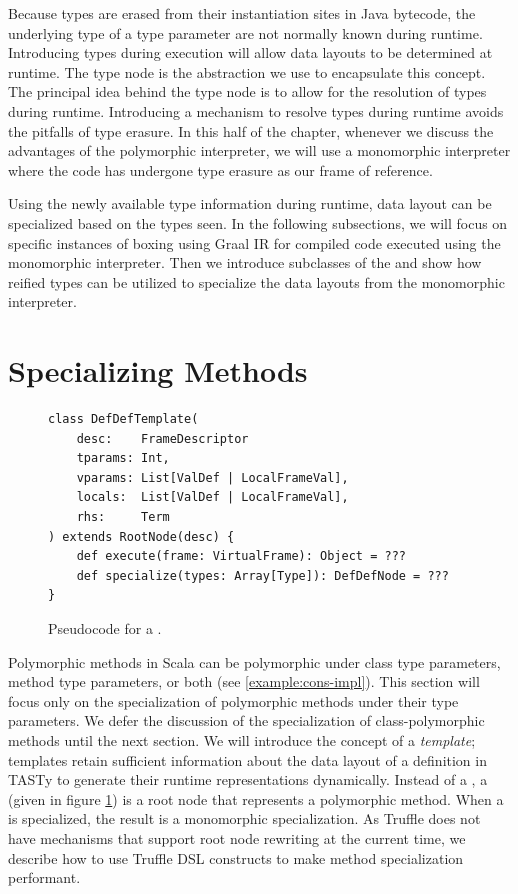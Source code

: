 Because types are erased from their instantiation sites in Java bytecode, the underlying type of a type parameter are not normally known during runtime. 
Introducing types during execution will allow data layouts to be determined at runtime.
The type node is the abstraction we use to encapsulate this concept.
The principal idea behind the type node is to allow for the resolution of types during runtime.
Introducing a mechanism to resolve types during runtime avoids the pitfalls of type erasure.
In this half of the chapter, whenever we discuss the advantages of the polymorphic interpreter, we will use a monomorphic interpreter where the code has undergone type erasure as our frame of reference.

Using the newly available type information during runtime, data layout can be specialized based on the types seen.
In the following subsections, we will focus on specific instances of boxing using Graal IR for compiled code executed using the monomorphic interpreter.
Then we introduce subclasses of the  and show how reified types can be utilized to specialize the data layouts from the monomorphic interpreter.

\section{Specializing Methods}

\begin{figure}[!htb]
\begin{verbatim}
class DefDefTemplate(
	desc:    FrameDescriptor
	tparams: Int, 
	vparams: List[ValDef | LocalFrameVal], 
	locals:  List[ValDef | LocalFrameVal],
	rhs:     Term
) extends RootNode(desc) {
	def execute(frame: VirtualFrame): Object = ???
	def specialize(types: Array[Type]): DefDefNode = ???
}
\end{verbatim}
\caption{Pseudocode for a .}
\label{impl:defdeftemplate}
\end{figure}

Polymorphic methods in Scala can be polymorphic under class type parameters, method type parameters, or both (see \ref{example:cons-impl}). 
This section will focus only on the specialization of polymorphic methods under their type parameters.
We defer the discussion of the specialization of class-polymorphic methods until the next section.
We will introduce the concept of a \textit{template}; templates retain sufficient information about the data layout of a definition in TASTy to generate their runtime representations dynamically.
Instead of a , a  (given in figure \ref{impl:defdeftemplate}) is a root node that represents a polymorphic method. 
When a  is specialized, the result is a monomorphic  specialization.
As Truffle does not have mechanisms that support root node rewriting at the current time, we describe how to use Truffle DSL constructs to make method specialization performant.

